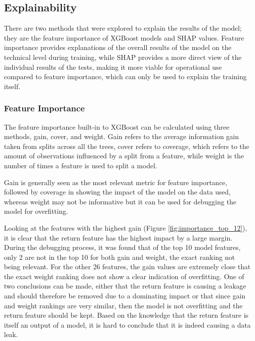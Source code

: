 \documentclass{article}
\begin{document}
\subsection{Explainability}

There are two methods that were explored to explain the results of the model; they are the feature importance of XGBoost models and SHAP values. Feature importance provides explanations of the overall results of the model on the technical level during training, while SHAP provides a more direct view of the individual results of the tests, making it more viable for operational use compared to feature importance, which can only be used to explain the training itself.

\subsubsection{Feature Importance}

The feature importance built-in to XGBoost can be calculated using three methods, gain, cover, and weight\cite{Amjad2019}. Gain refers to the average information gain taken from splits across all the trees, cover refers to coverage, which refers to the amount of observations influenced by a split from a feature, while weight is the number of times a feature is used to split a model.

Gain is generally seen as the most relevant metric for feature importance, followed by coverage in showing the impact of the model on the data used, whereas weight may not be informative but it can be used for debugging the model for overfitting. 

Looking at the features with the highest gain (Figure \ref{fig:importance_top_12}), it is clear that the return feature has the highest impact by a large margin. During the debugging process, it was found that of the top 10 model features, only 2 are not in the top 10 for both gain and weight, the exact ranking not being relevant. For the other 26 features, the gain values are extremely close that the exact weight ranking does not show a clear indication of overfitting. One of two conclusions can be made, either that the return feature is causing a leakage and should therefore be removed due to a dominating impact or that since gain and weight rankings are very similar, then the model is not overfitting and the return feature should be kept. Based on the knowledge that the return feature is itself an output of a model, it is hard to conclude that it is indeed causing a data leak.
\end{document}

